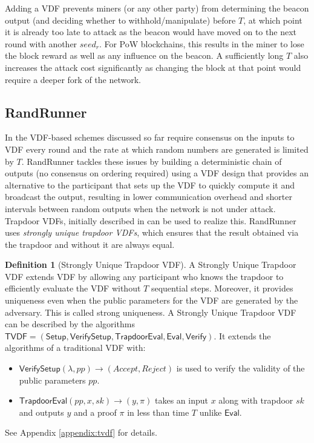 \documentclass[letterpaper,twocolumn,10pt]{article}
\theoremstyle{definition}
\newtheorem{definition}[theorem]{Definition}
\theoremstyle{remark}
\begin{document}
Adding a VDF prevents miners (or any other party) from determining the beacon output (and deciding whether to withhold/manipulate) before $T$, at which point it is already too late to attack as the beacon would have moved on to the next round with another $seed_r$. For PoW blockchains, this results in the miner to lose the block reward as well as any influence on the beacon. A sufficiently long $T$ also increases the attack cost significantly as changing the block at that point would require a deeper fork of the network. 

\subsection{RandRunner}
\label{subsection:randrunner}
In the VDF-based schemes discussed so far require consensus on the inputs to VDF every round and the rate at which random numbers are generated is limited by $T$. RandRunner \cite{schindler2021randrunner} tackles these issues by building a deterministic chain of outputs (no consensus on ordering required) using a VDF design that provides an alternative to the participant that sets up the VDF to quickly compute it and broadcast the output, resulting in lower communication overhead and shorter intervals between random outputs when the network is not under attack. Trapdoor VDFs, initially described in \cite{wesolowski2019efficient} can be used to realize this. RandRunner uses \emph{strongly unique trapdoor VDFs}, which ensures that the result obtained via the trapdoor and without it are always equal.

\begin{definition}[Strongly Unique Trapdoor VDF]
A Strongly Unique Trapdoor VDF extends VDF by allowing any participant who knows the trapdoor to efficiently evaluate the VDF without $T$ sequential steps. Moreover, it provides uniqueness even when the public parameters for the VDF are generated by the adversary. This is called strong uniqueness. A Strongly Unique Trapdoor VDF can be described by the algorithms $\mathsf{TVDF = (Setup,VerifySetup, TrapdoorEval, Eval, Verify)}$. It extends the algorithms of a traditional VDF with:
\begin{itemize}
    \item $\mathsf{VerifySetup}(\lambda, pp) \rightarrow (Accept, Reject)$ is used to verify the validity of the public parameters $pp$.
    \item $\mathsf{TrapdoorEval}(pp,x,sk) \rightarrow (y, \pi)$ takes an input $x$ along with trapdoor $sk$ and outputs $y$ and a proof $\pi$ in less than time $T$ unlike $\mathsf{Eval}$.
\end{itemize}
See Appendix \ref{appendix:tvdf} for details.
\end{definition}
\end{document}

